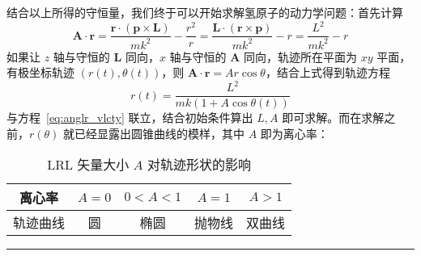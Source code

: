 \documentclass[cn,10pt,math=newtx,citestyle=gb7714-2015,bibstyle=gb7714-2015]{elegantbook}
\def\bm{\boldsymbol}
\def\srule{\noindent\rule{\linewidth}{0.3mm}}
\begin{document}
结合以上所得的守恒量，我们终于可以开始求解氢原子的动力学问题：首先计算
\begin{equation*}
    \bm A\cdot\bm r=\frac{\bm r\cdot(\bm p\times\bm L)}{mk^2}-\frac{r^2}{r}=\frac{\bm L\cdot(\bm r\times\bm p)}{mk^2}-r=\frac{L^2}{mk^2}-r
\end{equation*}
如果让 $z$ 轴与守恒的 $\bm L$ 同向，$x$ 轴与守恒的 $\bm A$ 同向，轨迹所在平面为 $xy$ 平面，有极坐标轨迹 $(r(t),\theta(t))$，则 $\bm A\cdot\bm r=Ar\cos\theta$，结合上式得到轨迹方程
\begin{equation}\label{eq:cnc_crv}
    r(t)=\frac{L^2}{mk(1+A\cos\theta(t))}
\end{equation}
与方程~\ref{eq:anglr_vlcty} 联立，结合初始条件算出 $L,A$ 即可求解。而在求解之前，$r(\theta)$ 就已经显露出圆锥曲线的模样，其中 $A$ 即为离心率：
\begin{table}[!htbp]
    \centering
    \caption{LRL 矢量大小 $A$ 对轨迹形状的影响}
    \begin{tabular}{c|cccc}
    \toprule
    离心率 & $A=0$    & $0<A<1$ & $A=1$ & $A>1$\\
    \midrule
    轨迹曲线 &圆    & 椭圆 & 抛物线 & 双曲线\\
    \bottomrule
    \end{tabular}
    \label{tab:LRL_vctr_trjctry}
\end{table}

\srule
\end{document}
